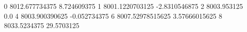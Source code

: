 0 8012.677734375 8.724609375
1 8001.1220703125 -2.8310546875
2 8003.953125 0.0
4 8003.900390625 -0.052734375
6 8007.52978515625 3.57666015625
8 8033.5234375 29.5703125
